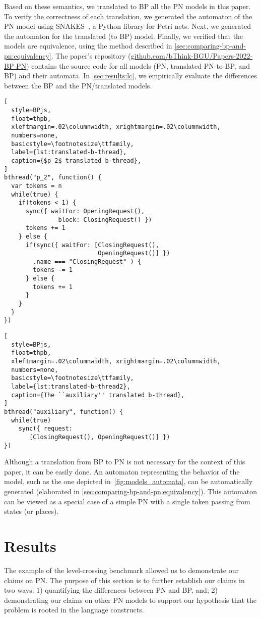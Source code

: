 \documentclass[10pt,journal,compsoc]{IEEEtran}
\theoremstyle{definition}
\begin{document}
Based on these semantics, we translated to BP all the PN models in this paper. 
To verify the correctness of each translation, we generated the automaton of the PN model using SNAKES~\cite{pommereau2015snakes}, a Python library for Petri nets. Next, we generated the automaton for the translated (to BP) model. Finally, we verified that the models are equivalence, using the method described in \autoref{sec:comparing-bp-and-pn:equivalency}. The paper's repository (\url{github.com/bThink-BGU/Papers-2022-BP-PN}) contains the source code for all models (PN, translated-PN-to-BP, and BP) and their automata. In \autoref{sec:results:lc}, we empirically evaluate the differences between the BP and the PN/translated models.

\begin{lstlisting}[
  style=BPjs,
  float=thpb,
  xleftmargin=.02\columnwidth, xrightmargin=.02\columnwidth,
  numbers=none,
  basicstyle=\footnotesize\ttfamily,
  label={lst:translated-b-thread},
  caption={$p_2$ translated b-thread},
]
bthread("p_2", function() {
  var tokens = n
  while(true) {
    if(tokens < 1) {
      sync({ waitFor: OpeningRequest(), 
               block: ClosingRequest() })
      tokens += 1
    } else {
      if(sync({ waitFor: [ClosingRequest(),
                          OpeningRequest()] })
        .name === "ClosingRequest" ) {
        tokens -= 1
      } else {
        tokens += 1
      }
    }
  }
})
\end{lstlisting}

\begin{lstlisting}[
  style=BPjs,
  float=thpb,
  xleftmargin=.02\columnwidth, xrightmargin=.02\columnwidth,
  numbers=none,
  basicstyle=\footnotesize\ttfamily,
  label={lst:translated-b-thread2},
  caption={The ``auxiliary'' translated b-thread},
]
bthread("auxiliary", function() {
  while(true)
    sync({ request: 
       [ClosingRequest(), OpeningRequest()] })
})
\end{lstlisting}

Although a translation from BP to PN is not necessary for the context of this paper, it can be easily done. An automaton representing the behavior of the model, such as the one depicted in~\autoref{fig:models_automata}, can be automatically generated (elaborated in \autoref{sec:comparing-bp-and-pn:equivalency}). This automaton can be viewed as a special case of a simple PN with a single token passing from states (or places). 

\section{Results}
\label{sec:results}
The example of the level-crossing benchmark allowed us to demonstrate our claims on PN. The purpose of this section is to further establish our claims in two ways: 1) quantifying the differences between PN and BP, and; 2) demonstrating our claims on other PN models to support our hypothesis that the problem is rooted in the language constructs.
\end{document}
